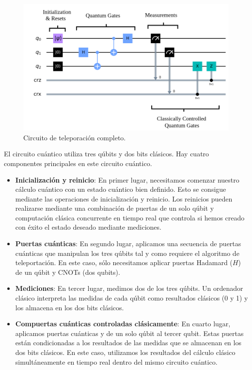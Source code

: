 \documentclass[a4paper,11pt]{book} %
\numberwithin{equation}{chapter}
\begin{document}
	\begin{figure}[H]
	\centering 
	\includegraphics[width=0.7\linewidth]{Figuras/Fig_elementos_teleportacion.png}
	\caption{Circuito de teleporación completo.}
	\label{Fig_elementos_teleportacion}
	\end{figure}

El circuito cuántico utiliza tres qúbits y dos bits clásicos. Hay cuatro componentes principales en este circuito cuántico.
\begin{itemize}
	\item \textbf{Inicialización y reinicio}: 
	En primer lugar, necesitamos comenzar nuestro cálculo cuántico con un estado cuántico bien definido. Esto se consigue mediante las operaciones de inicialización y reinicio. Los reinicios pueden realizarse mediante una combinación de puertas de un solo qúbit y computación clásica concurrente en tiempo real que controla si hemos creado con éxito el estado deseado mediante mediciones. 
 
 	\item \textbf{Puertas cuánticas}: 
 	En segundo lugar, aplicamos una secuencia de puertas cuánticas que manipulan los tres qúbits tal y como requiere el algoritmo de teleportación. En este caso, sólo necesitamos aplicar puertas Hadamard ($H$) de un qúbit y CNOTs (dos qubits).

 	
 	\item \textbf{Mediciones}:
 	En tercer lugar, medimos dos de los tres qúbits. Un ordenador clásico interpreta las medidas de cada qúbit como resultados clásicos (0 y 1) y los almacena en los dos bits clásicos.
 	
 	\item \textbf{Compuertas cuánticas controladas clásicamente}:
 	En cuarto lugar, aplicamos puertas cuánticas y de un solo qúbit al tercer qubit. Estas puertas están condicionadas a los resultados de las medidas que se almacenan en los dos bits clásicos. En este caso, utilizamos los resultados del cálculo clásico simultáneamente en tiempo real dentro del mismo circuito cuántico.
\end{itemize}
\end{document}
